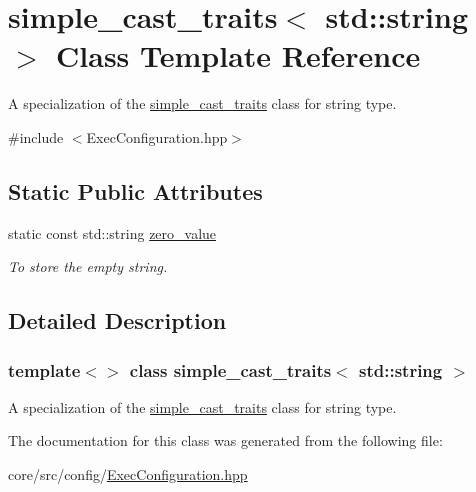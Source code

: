 \hypertarget{classsimple__cast__traits_3_01std_1_1string_01_4}{
\section{simple\_\-cast\_\-traits$<$ std::string $>$ Class Template Reference}
\label{classsimple__cast__traits_3_01std_1_1string_01_4}
}


A specialization of the \hyperlink{classsimple__cast__traits}{simple\_\-cast\_\-traits} class for string type.  




{\ttfamily \#include $<$ExecConfiguration.hpp$>$}

\subsection*{Static Public Attributes}
\begin{DoxyCompactItemize}
\item 
\hypertarget{classsimple__cast__traits_3_01std_1_1string_01_4_af22233acb9498c4504a1374e8af33fb3}{
static const std::string \hyperlink{classsimple__cast__traits_3_01std_1_1string_01_4_af22233acb9498c4504a1374e8af33fb3}{zero\_\-value}}
\label{classsimple__cast__traits_3_01std_1_1string_01_4_af22233acb9498c4504a1374e8af33fb3}

\begin{DoxyCompactList}\small\item\em To store the empty string. \item\end{DoxyCompactList}\end{DoxyCompactItemize}


\subsection{Detailed Description}
\subsubsection*{template$<$$>$ class simple\_\-cast\_\-traits$<$ std::string $>$}

A specialization of the \hyperlink{classsimple__cast__traits}{simple\_\-cast\_\-traits} class for string type. 

The documentation for this class was generated from the following file:\begin{DoxyCompactItemize}
\item 
core/src/config/\hyperlink{ExecConfiguration_8hpp}{ExecConfiguration.hpp}\end{DoxyCompactItemize}
